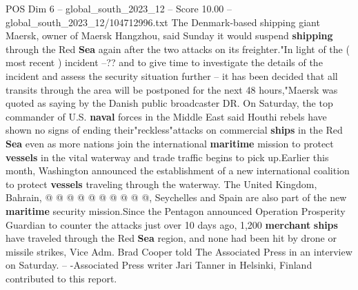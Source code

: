 \begin{textsample}{POS Dim 6 – global\_south\_2023\_12 – Score 10.00 – global\_south\_2023\_12/104712996.txt}
The Denmark-based shipping giant Maersk, owner of Maersk Hangzhou, said Sunday it would suspend \textbf{shipping} through the Red \textbf{Sea} again after the two attacks on its freighter."In light of the ( most recent ) incident --?? and to give time to investigate the details of the incident and assess the security situation further -- it has been decided that all transits through the area will be postponed for the next 48 hours,"Maersk was quoted as saying by the Danish public broadcaster DR.
On Saturday, the top commander of U.S. \textbf{naval} forces in the Middle East said Houthi rebels have shown no signs of ending their"reckless"attacks on commercial \textbf{ships} in the Red \textbf{Sea} even as more nations join the international \textbf{maritime} mission to protect \textbf{vessels} in the vital waterway and trade traffic begins to pick up.Earlier this month, Washington announced the establishment of a new international coalition to protect \textbf{vessels} traveling through the waterway.
The United Kingdom, Bahrain, @ @ @ @ @ @ @ @ @ @, Seychelles and Spain are also part of the new \textbf{maritime} security mission.Since the Pentagon announced Operation Prosperity Guardian to counter the attacks just over 10 days ago, 1,200 \textbf{merchant} \textbf{ships} have traveled through the Red \textbf{Sea} region, and none had been hit by drone or missile strikes, Vice Adm.
Brad Cooper told The Associated Press in an interview on Saturday. -- -Associated Press writer Jari Tanner in Helsinki, Finland contributed to this report.

\end{textsample}
